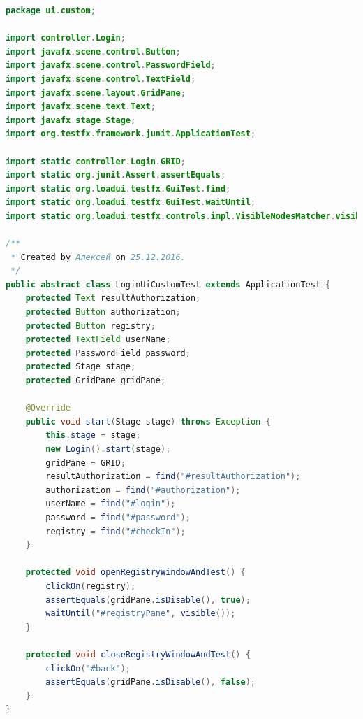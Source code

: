 \documentclass[a4paper,12pt]{article}
\begin{document}
\newpage
\begin{lstlisting}[language=java, caption=код модуля LoginUiCustomTest.java]
package ui.custom;

import controller.Login;
import javafx.scene.control.Button;
import javafx.scene.control.PasswordField;
import javafx.scene.control.TextField;
import javafx.scene.layout.GridPane;
import javafx.scene.text.Text;
import javafx.stage.Stage;
import org.testfx.framework.junit.ApplicationTest;

import static controller.Login.GRID;
import static org.junit.Assert.assertEquals;
import static org.loadui.testfx.GuiTest.find;
import static org.loadui.testfx.GuiTest.waitUntil;
import static org.loadui.testfx.controls.impl.VisibleNodesMatcher.visible;

/**
 * Created by Алексей on 25.12.2016.
 */
public abstract class LoginUiCustomTest extends ApplicationTest {
    protected Text resultAuthorization;
    protected Button authorization;
    protected Button registry;
    protected TextField userName;
    protected PasswordField password;
    protected Stage stage;
    protected GridPane gridPane;

    @Override
    public void start(Stage stage) throws Exception {
        this.stage = stage;
        new Login().start(stage);
        gridPane = GRID;
        resultAuthorization = find("#resultAuthorization");
        authorization = find("#authorization");
        userName = find("#login");
        password = find("#password");
        registry = find("#checkIn");
    }

    protected void openRegistryWindowAndTest() {
        clickOn(registry);
        assertEquals(gridPane.isDisable(), true);
        waitUntil("#registryPane", visible());
    }

    protected void closeRegistryWindowAndTest() {
        clickOn("#back");
        assertEquals(gridPane.isDisable(), false);
    }
}
\end{lstlisting}
\end{document}

